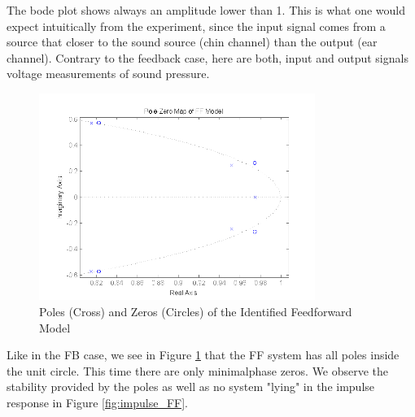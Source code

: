 The bode plot shows always an amplitude lower than 1. This is what one would expect intuitically from the experiment, since the input signal comes from a source that closer to the sound source (chin channel) than the output (ear channel). Contrary to the feedback case, here are both, input and output signals voltage measurements of sound pressure.\\

\begin{figure}[h]
\centering
\includegraphics[width=0.8\textwidth]{pics/pole_FF}
\caption{Poles (Cross) and Zeros (Circles) of the Identified Feedforward Model}
\label{fig:pole_FF}
\end{figure}

Like in the FB case, we see in Figure \ref{fig:pole_FF} that the FF system has all poles inside the unit circle. This time there are only minimalphase zeros. We observe the stability provided by the poles as well as no system "lying" in the impulse response in Figure \ref{fig:impulse_FF}. \\

